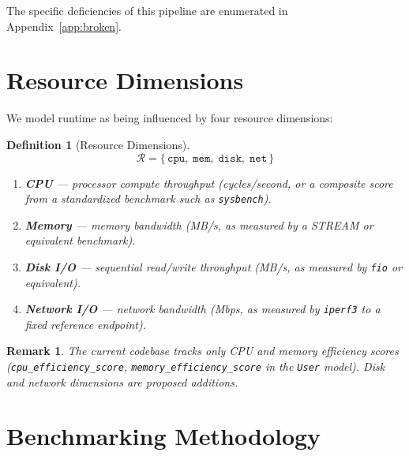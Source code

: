 \documentclass[11pt, a4paper]{article}
\newtheorem{definition}{Definition}
\newtheorem{remark}{Remark}
\begin{document}
The specific deficiencies of this pipeline are enumerated in
Appendix~\ref{app:broken}.

\section{Resource Dimensions}
\label{sec:resources}

We model runtime as being influenced by four resource dimensions:

\begin{definition}[Resource Dimensions]
\[
    \mathcal{R} = \{\, \texttt{cpu},\; \texttt{mem},\; \texttt{disk},\; \texttt{net} \,\}
\]
\begin{enumerate}[label=(\alph*)]
    \item \textbf{CPU} --- processor compute throughput (cycles/second, or a
          composite score from a standardized benchmark such as \texttt{sysbench}).
    \item \textbf{Memory} --- memory bandwidth (MB/s, as measured by a STREAM
          or equivalent benchmark).
    \item \textbf{Disk I/O} --- sequential read/write throughput (MB/s, as
          measured by \texttt{fio} or equivalent).
    \item \textbf{Network I/O} --- network bandwidth (Mbps, as measured by
          \texttt{iperf3} to a fixed reference endpoint).
\end{enumerate}
\end{definition}

\begin{remark}
The current codebase tracks only CPU and memory efficiency scores
(\texttt{cpu\_efficiency\_score}, \texttt{memory\_efficiency\_score} in the
\texttt{User} model). Disk and network dimensions are proposed additions.
\end{remark}

\section{Benchmarking Methodology}
\label{sec:benchmarking}

\end{document}
